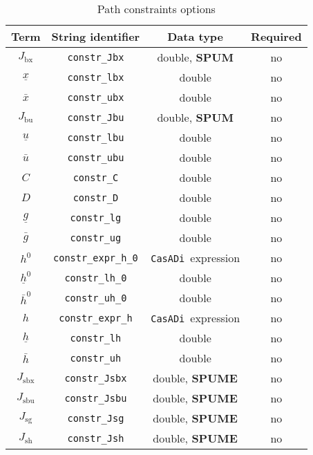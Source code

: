 \documentclass[english]{article}
\newcommand{\code}[1]{\texttt{#1}}
\newcommand{\casadi}{\texttt{CasADi}}
\newcommand{\ind}[1]{_{\textrm{#1}}}
\newcommand{\initial}{^{\textrm{0}}}
\newcommand{\optional}{no}
\begin{document}
\begin{table}[ht!]
    \centering
    \caption{Path constraints options} \label{tab:constraints:path}
    \begin{tabular}{cccc}
        \toprule
        Term & String identifier & Data type & Required \\ \midrule
        $J\ind{bx}$ & \code{constr\_Jbx}    & double, \textbf{SPUM} & \optional  \\
        $\underline{x} $    & \code{constr\_lbx}     & double  & \optional  \\
        $\bar{x} $  & \code{constr\_ubx}     & double  & \optional   \\ [1em]
        $J\ind{bu}$ & \code{constr\_Jbu}    & double, \textbf{SPUM}   & \optional    \\
        $\underline{u} $    & \code{constr\_lbu}     & double   & \optional   \\
        $\bar{u} $         & \code{constr\_ubu}     & double  & \optional   \\ [1em]
        $C$ & \code{constr\_C}    & double  & \optional \\
        $D $    & \code{constr\_D}     & double  & \optional \\
        $\underline{g} $    & \code{constr\_lg}     & double  & \optional    \\
        $\bar{g} $         & \code{constr\_ug}     & double  & \optional   \\ [1em]
        $ h\initial $ & \code{constr\_expr\_h\_0}    & \casadi~expression  & \optional   \\
        $\underline{h}\initial $    & \code{constr\_lh\_0}     & double   & \optional   \\
        $\bar{h}\initial $         & \code{constr\_uh\_0}     & double  & \optional   \\ [1em]
        $ h $ & \code{constr\_expr\_h}    & \casadi~expression  & \optional   \\
        $\underline{h} $    & \code{constr\_lh}     & double   & \optional   \\
        $\bar{h} $         & \code{constr\_uh}     & double  & \optional   \\ [1em]
        $ J\ind{sbx} $ & \code{constr\_Jsbx} & double, \textbf{SPUME} & \optional  \\
        $ J\ind{sbu} $ & \code{constr\_Jsbu} & double, \textbf{SPUME}  & \optional \\
        $ J\ind{sg} $ & \code{constr\_Jsg} & double, \textbf{SPUME} & \optional  \\
        $ J\ind{sh} $ & \code{constr\_Jsh} & double, \textbf{SPUME}  & \optional  \\
        \bottomrule
    \end{tabular}
\end{table}
%
\end{document}
